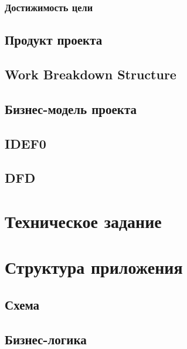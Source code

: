 \documentclass[a4paper, 14pt]{extarticle}
\begin{document}
    \subsubsection{Достижимость цели}
		
  \subsection{Продукт проекта}
  
  \subsection{Work Breakdown Structure}
  
  \subsection{Бизнес-модель проекта}
  
  \subsection{IDEF0}
  
  \subsection{DFD}

\newpage


\section{Техническое задание}

\newpage


\section{Структура приложения}
  \subsection{Схема}
  
  \subsection{Бизнес-логика}
  
\end{document}
